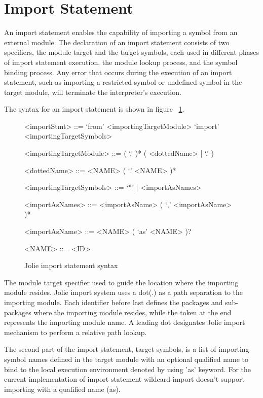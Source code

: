 
\section{Import Statement}

An import statement enables the capability of importing a symbol from an external module. The declaration of an import statement consists of two specifiers, the module target and the target symbols, each used in different phases of import statement execution, the module lookup process, and the symbol binding process. Any error that occurs during the execution of an import statement, such as importing a restricted symbol or undefined symbol in the target module, will terminate the interpreter's execution.

The syntax for an import statement is shown in figure ~\ref{fig:jolie-import-stmt-syntax}.

\begin{figure}[ht]
    \begin{framed}
        \begin{grammar}
            <importStmt>
            ::= `from' <importingTargetModule> `import' <importingTargetSymbols>

            <importingTargetModule> ::= ( `.' )* ( <dottedName> | `.' )

            <dottedName>
            ::= <NAME> ( `.' <NAME> )*

            <importingTargetSymbols> ::=  `*' | <importAsNames>

            <importAsNames>
            ::= <importAsName> ( `,' <importAsName> )*

            <importAsName>
            ::= <NAME> ( `as' <NAME> )?

            <NAME> ::= <ID>
        \end{grammar}
    \end{framed}
    \caption{Jolie import statement syntax }
    \label{fig:jolie-import-stmt-syntax}
\end{figure}

The module target specifier used to guide the location where the importing module resides. Jolie import system uses a dot(.) as a path separation to the importing module. Each identifier before last defines the packages and sub-packages where the importing module resides, while the token at the end represents the importing module name. A leading dot designates Jolie import mechanism to perform a relative path lookup.

The second part of the import statement, target symbols, is a list of importing symbol names defined in the target module with an optional qualified name to bind to the local execution environment denoted by using 'as' keyword. For the current implementation of import statement wildcard import doesn't support importing with a qualified name (as).